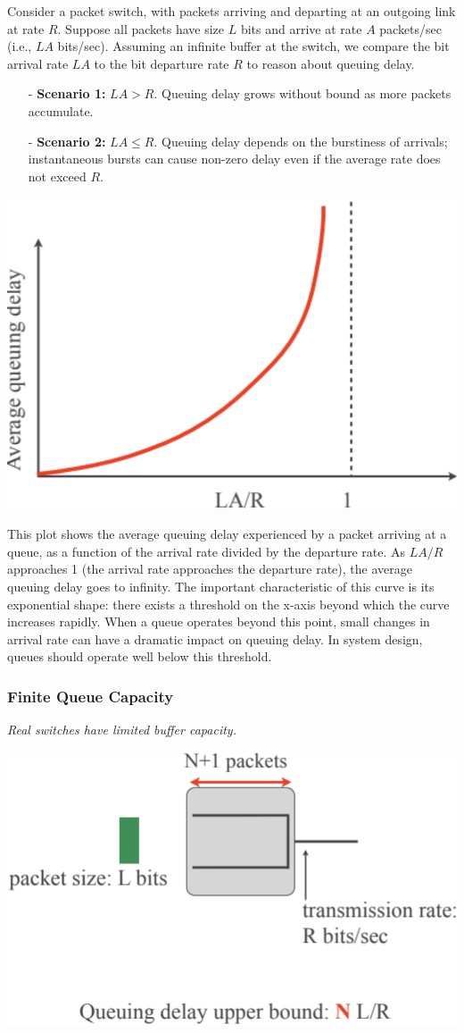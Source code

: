 \documentclass[../../compsys.tex]{subfiles}
\begin{document}
Consider a packet switch, with packets arriving and departing at an outgoing link at rate $R$. Suppose all packets have size $L$ bits and arrive at rate $A$ packets/sec (i.e., $LA$ bits/sec). Assuming an infinite buffer at the switch, we compare the bit arrival rate $LA$ to the bit departure rate $R$ to reason about queuing delay.

\begin{itemize}
  \item[-] \textbf{Scenario 1:} $LA > R$. Queuing delay grows without bound as more packets accumulate.
  \item[-] \textbf{Scenario 2:} $LA \le R$. Queuing delay depends on the burstiness of arrivals; instantaneous bursts can cause non-zero delay even if the average rate does not exceed $R$.
\end{itemize}

\begin{center}
  \includegraphics[width=.55\textwidth]{images/queuing_delay_plot.png}
\end{center}

This plot shows the average queuing delay experienced by a packet arriving at a queue, as a function of the arrival rate divided by the departure rate. As $LA/R$ approaches 1 (the arrival rate approaches the departure rate), the average queuing delay goes to infinity. The important characteristic of this curve is its exponential shape: there exists a threshold on the x-axis beyond which the curve increases rapidly. When a queue operates beyond this point, small changes in arrival rate can have a dramatic impact on queuing delay. In system design, queues should operate well below this threshold.

\subsubsection{Finite Queue Capacity}
\textit{Real switches have limited buffer capacity.}

\begin{center}
  \includegraphics[width=.55\textwidth]{images/queuing_delay_upperbound.png}
\end{center}
\end{document}
